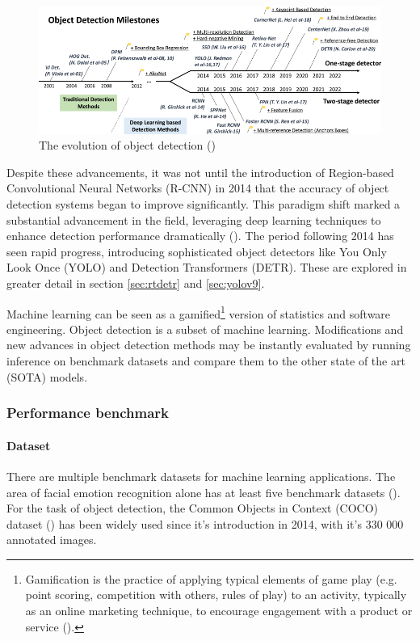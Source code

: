 \begin{figure}[H]
    \centering
    \includegraphics[width=1\linewidth]{Images/Diagrams/object_detection_20years.png}
    \caption{The evolution of object detection (\cite{zou2023object_detection_in_20_years})}
    \label{fig:object_detect_20_years}
\end{figure}

Despite these advancements, it was not until the introduction of Region-based Convolutional Neural Networks (R-CNN) in 2014 that the accuracy of object detection systems began to improve significantly. This paradigm shift marked a substantial advancement in the field, leveraging deep learning techniques to enhance detection performance dramatically (\cite{zou2023object_detection_in_20_years}). The period following 2014 has seen rapid progress, introducing sophisticated object detectors like You Only Look Once (YOLO) and Detection Transformers (DETR). These are explored in greater detail in section \ref{sec:rtdetr} and \ref{sec:yolov9}.

Machine learning can be seen as a gamified\footnote{Gamification is the practice of applying typical elements of game play (e.g. point scoring, competition with others, rules of play) to an activity, typically as an online marketing technique, to encourage engagement with a product or service (\cite{ox2023gamification}).} version of statistics and software engineering. Object detection is a subset of machine learning. Modifications and new advances in object detection methods may be instantly evaluated by running inference on benchmark datasets and compare them to the other state of the art (SOTA) models.

\subsubsection{Performance benchmark}
\label{sec:performance_benchmark}

\paragraph{Dataset}
There are multiple benchmark datasets for machine learning applications. The area of facial emotion recognition alone has at least five benchmark datasets (\cite{sa2022facialemotions}). For the task of object detection, the Common Objects in Context (COCO) dataset (\cite{li2014cocodataset}) has been widely used since it's introduction in 2014, with it's 330 000 annotated images.

